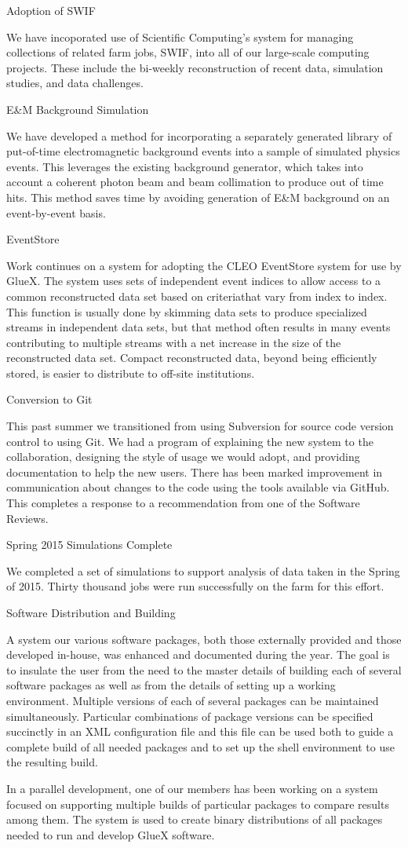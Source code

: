 Adoption of SWIF

We have incoporated use of Scientific Computing's system for managing
collections of related farm jobs, SWIF, into all of our large-scale
computing projects. These include the bi-weekly reconstruction of
recent data, simulation studies, and data challenges.

E&M Background Simulation

We have developed a method for incorporating a separately generated
library of put-of-time electromagnetic background events into a sample
of simulated physics events. This leverages the existing background
generator, which takes into account a coherent photon beam and beam
collimation to produce out of time hits. This method saves time by
avoiding generation of E&M background on an event-by-event basis.

EventStore

Work continues on a system for adopting the CLEO EventStore system for
use by GlueX. The system uses sets of independent event indices to
allow access to a common reconstructed data set based on criteriathat
vary from index to index. This function is usually done by skimming
data sets to produce specialized streams in independent data sets, but
that method often results in many events contributing to multiple
streams with a net increase in the size of the reconstructed data
set. Compact reconstructed data, beyond being efficiently stored, is
easier to distribute to off-site institutions.

Conversion to Git

This past summer we transitioned from using Subversion for source code
version control to using Git. We had a program of explaining the new
system to the collaboration, designing the style of usage we would
adopt, and providing documentation to help the new users. There has
been marked improvement in communication about changes to the code
using the tools available via GitHub. This completes a response to a
recommendation from one of the Software Reviews.

Spring 2015 Simulations Complete

We completed a set of simulations to support analysis of data taken in
the Spring of 2015. Thirty thousand jobs were run successfully on the
farm for this effort.

Software Distribution and Building

A system our various software packages, both those externally provided
and those developed in-house, was enhanced and documented during the
year. The goal is to insulate the user from the need to the master
details of building each of several software packages as well as from
the details of setting up a working environment. Multiple versions of
each of several packages can be maintained simultaneously. Particular
combinations of package versions can be specified succinctly in an XML
configuration file and this file can be used both to guide a complete
build of all needed packages and to set up the shell environment to
use the resulting build.

In a parallel development, one of our members has been working on a
system focused on supporting multiple builds of particular packages to
compare results among them. The system is used to create binary
distributions of all packages needed to run and develop GlueX
software.


